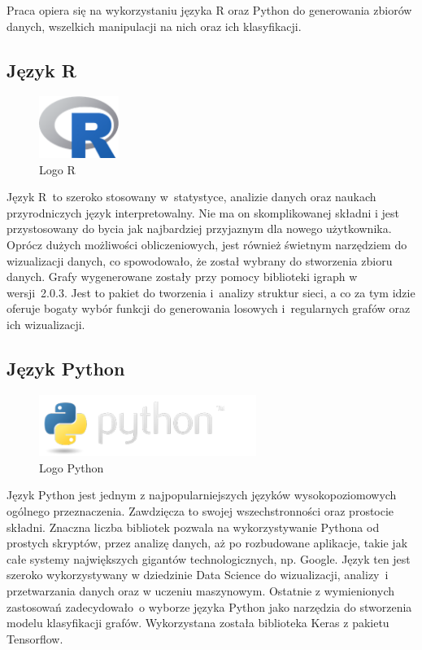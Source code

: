 Praca opiera się na wykorzystaniu języka R oraz Python do generowania zbiorów danych,
wszelkich manipulacji na nich oraz ich klasyfikacji.

\subsection{Język R}

\begin{figure}[ht]
	\centering
	\includegraphics[height=2cm]{partials/images/logo_r.png}
	\caption{Logo R \cite{strR}}
	\label{Fig:tech-r}
\end{figure}
\FloatBarrier

Język R~to szeroko stosowany w~statystyce, analizie danych oraz naukach przyrodniczych język interpretowalny.
Nie ma on skomplikowanej składni i jest przystosowany do bycia jak najbardziej przyjaznym dla nowego użytkownika.
Oprócz dużych możliwości obliczeniowych, jest również świetnym narzędziem do wizualizacji danych,
co spowodowało, że został wybrany do stworzenia zbioru danych.
Grafy wygenerowane zostały przy pomocy biblioteki igraph w wersji~2.0.3.
Jest to pakiet do tworzenia i~analizy struktur sieci, a co za tym idzie oferuje bogaty wybór funkcji do
generowania losowych i~regularnych grafów oraz ich wizualizacji.

\subsection{Język Python}

\begin{figure}[ht]
	\centering
	\includegraphics[height=2cm]{partials/images/logo_python.png}
	\caption{Logo Python \cite{strPython}}
	\label{Fig:tech-python}
\end{figure}
\FloatBarrier

Język Python jest jednym z najpopularniejszych języków wysokopoziomowych ogólnego przeznaczenia.
Zawdzięcza to swojej wszechstronności oraz prostocie składni.
Znaczna liczba bibliotek pozwala na wykorzystywanie Pythona od
prostych skryptów, przez analizę danych, aż po rozbudowane aplikacje, takie jak całe
systemy największych gigantów technologicznych, np. Google. Język ten jest szeroko
wykorzystywany w dziedzinie Data Science do wizualizacji, analizy~i przetwarzania danych oraz w uczeniu maszynowym.
Ostatnie z wymienionych zastosowań zadecydowało~o wyborze języka Python jako narzędzia do stworzenia modelu klasyfikacji grafów.
Wykorzystana została biblioteka Keras z pakietu Tensorflow.

